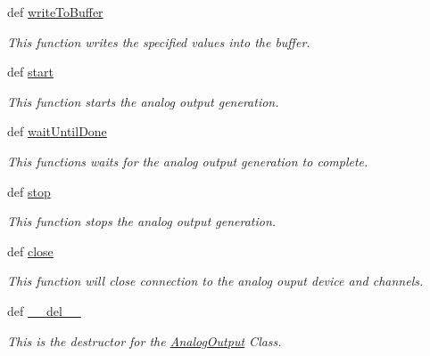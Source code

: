 \begin{DoxyCompactItemize}
def \hyperlink{class_analog_output_1_1_analog_output_abd580af62942a68e3a453f8cfe499acb}{write\-To\-Buffer}
\begin{DoxyCompactList}\small\item\em This function writes the specified values into the buffer. \end{DoxyCompactList}\item 
def \hyperlink{class_analog_output_1_1_analog_output_a81a248ecf2eb72256cb58979e752e712}{start}
\begin{DoxyCompactList}\small\item\em This function starts the analog output generation. \end{DoxyCompactList}\item 
def \hyperlink{class_analog_output_1_1_analog_output_aa88017f59be11baa9c4284e9a7b39bbe}{wait\-Until\-Done}
\begin{DoxyCompactList}\small\item\em This functions waits for the analog output generation to complete. \end{DoxyCompactList}\item 
def \hyperlink{class_analog_output_1_1_analog_output_ae8b99d08fc29d3ff472824430ebd4067}{stop}
\begin{DoxyCompactList}\small\item\em This function stops the analog output generation. \end{DoxyCompactList}\item 
def \hyperlink{class_analog_output_1_1_analog_output_a483e645ff5fc84cd5f9cf4b146d9af0e}{close}
\begin{DoxyCompactList}\small\item\em This function will close connection to the analog ouput device and channels. \end{DoxyCompactList}\item 
def \hyperlink{class_analog_output_1_1_analog_output_a09b8b0f6cb839a7f00d45129340e5bea}{\-\_\-\-\_\-del\-\_\-\-\_\-}
\begin{DoxyCompactList}\small\item\em This is the destructor for the \hyperlink{class_analog_output_1_1_analog_output}{Analog\-Output} Class. \end{DoxyCompactList}\end{DoxyCompactItemize}
